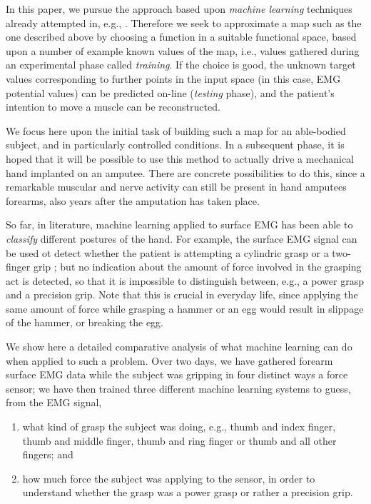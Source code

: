 In this paper, we pursue the approach based upon \emph{machine
learning} techniques already attempted in, e.g.,
\cite{dunlop,fukuda,smagt}. Therefore we seek to approximate a map
such as the one described above by choosing a function in a suitable
functional space, based upon a number of example known values of the
map, i.e., values gathered during an experimental phase called
\emph{training}. If the choice is good, the unknown target values
corresponding to further points in the input space (in this case, EMG
potential values) can be predicted on-line (\emph{testing} phase), and
the patient's intention to move a muscle can be reconstructed.

We focus here upon the initial task of building such a map for an
able-bodied subject, and in particularly controlled conditions. In a
subsequent phase, it is hoped that it will be possible to use this
method to actually drive a mechanical hand implanted on an
amputee. There are concrete possibilities to do this, since a
remarkable muscular and nerve activity can still be present in hand
amputees forearms, also years after the amputation has taken place.

So far, in literature, machine learning applied to surface EMG has
been able to \emph{classify} different postures of the hand. For
example, the surface EMG signal can be used ot detect whether the
patient is attempting a cylindric grasp or a two-finger grip
\cite{ekvall}; but no indication about the amount of force involved in
the grasping act is detected, so that it is impossible to distinguish
between, e.g., a power grasp and a precision grip. Note that this is
crucial in everyday life, since applying the same amount of force
while grasping a hammer or an egg would result in slippage of the
hammer, or breaking the egg.

We show here a detailed comparative analysis of what machine learning
can do when applied to such a problem. Over two days, we have gathered
forearm surface EMG data while the subject was gripping in four
distinct ways a force sensor; we have then trained three different
machine learning systems to guess, from the EMG signal,

\begin{enumerate}

  \item what kind of grasp the subject was doing, e.g., thumb and index
    finger, thumb and middle finger, thumb and ring finger or thumb
    and all other fingers; and

  \item how much force the subject was applying to the sensor, in
    order to understand whether the grasp was a power grasp or rather
    a precision grip.

\end{enumerate}

